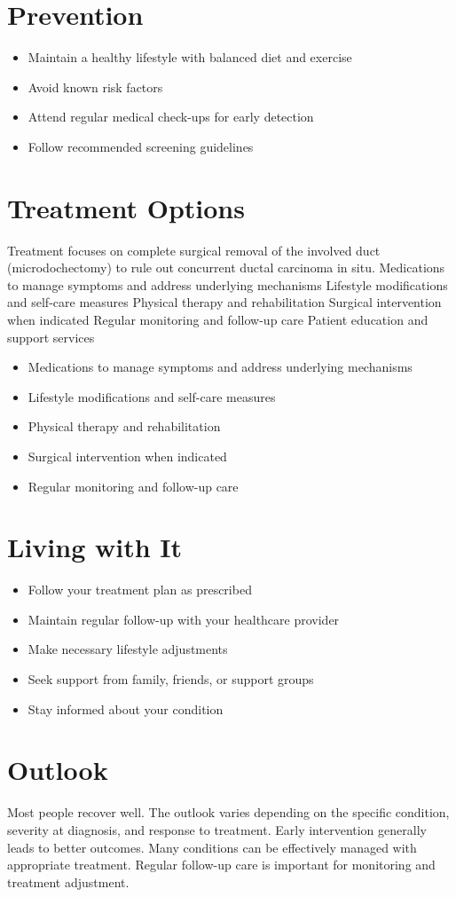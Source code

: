 \section{Prevention}
\begin{itemize}[noitemsep]
  \item Maintain a healthy lifestyle with balanced diet and exercise
  \item Avoid known risk factors
  \item Attend regular medical check-ups for early detection
  \item Follow recommended screening guidelines
\end{itemize}
\section{Treatment Options}
Treatment focuses on complete surgical removal of the involved duct (microdochectomy) to rule out concurrent ductal carcinoma in situ. Medications to manage symptoms and address underlying mechanisms Lifestyle modifications and self-care measures Physical therapy and rehabilitation Surgical intervention when indicated Regular monitoring and follow-up care Patient education and support services

\begin{itemize}[noitemsep]
  \item Medications to manage symptoms and address underlying mechanisms
  \item Lifestyle modifications and self-care measures
  \item Physical therapy and rehabilitation
  \item Surgical intervention when indicated
  \item Regular monitoring and follow-up care
\end{itemize}
\section{Living with It}
\begin{itemize}[noitemsep]
  \item Follow your treatment plan as prescribed
  \item Maintain regular follow-up with your healthcare provider
  \item Make necessary lifestyle adjustments
  \item Seek support from family, friends, or support groups
  \item Stay informed about your condition
\end{itemize}
\section{Outlook}
Most people recover well. The outlook varies depending on the specific condition, severity at diagnosis, and response to treatment. Early intervention generally leads to better outcomes. Many conditions can be effectively managed with appropriate treatment. Regular follow-up care is important for monitoring and treatment adjustment.
